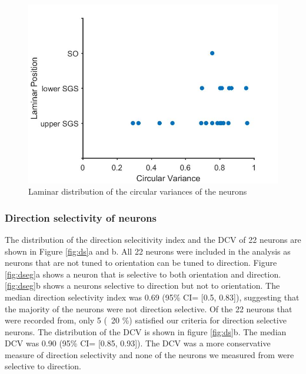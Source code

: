 		\begin{figure}[H]
		\includegraphics[width=\linewidth]{superiorcolliculus/cvvlampos.jpg}
		\caption{Laminar distribution of the circular variances of the neurons}
		\label{fig:lp}			
	\end{figure}
	
	\subsubsection{Direction selectivity of neurons}
	The distribution of the direction selecitivity index and the DCV of 22 neurons are shown in Figure \ref{fig:ds}a and b. All 22 neurons were included in the analysis as neurons that are not tuned to orientation can be tuned to direction. Figure \ref{fig:dseg}a shows a neuron that is selective to both orientation and direction. \ref{fig:dseg}b shows a neurons selective to direction but not to orientation. The median direction selectivity index was 0.69 (95\% CI= [0.5, 0.83]), suggesting that the majority of the neurons were not direction selective. Of the 22 neurons that were recorded from, only 5 (~20 \%) satisfied our criteria for direction selective neurons. The distribution of the DCV is shown in figure \ref{fig:ds}b. The median DCV was 0.90 (95\% CI= [0.85, 0.93]). The DCV was a more conservative measure of direction selectivity and none of the neurons we measured from were selective to direction.
	
